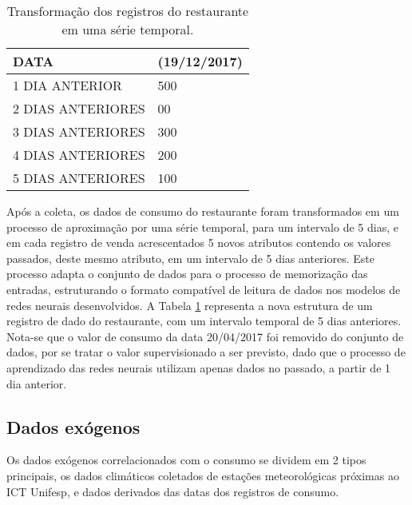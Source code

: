             \begin{table}[!ht]
                \centering
                \begin{tabular}{|l|l|}
                \hline
                    DATA                  & (19/12/2017) \\ \hline
                1 DIA ANTERIOR    & 500        \\
                2 DIAS ANTERIORES & 00                            \\
                3 DIAS ANTERIORES & 300                            \\
                4 DIAS ANTERIORES & 200                            \\
                5 DIAS ANTERIORES & 100                          \\ \hline 
                \end{tabular}
                \caption{Transformação dos registros do restaurante em uma série temporal.}
                \label{table:transformacaodadosrestaurante}
            \end{table}
            
            Após a coleta, os dados de consumo do restaurante foram transformados em um processo de aproximação por uma série temporal, para um intervalo de 5 dias, e em cada registro de venda  acrescentados 5 novos atributos contendo os valores passados, deste mesmo atributo, em um intervalo de 5 dias anteriores. Este processo adapta o conjunto de dados para o processo de memorização das entradas, estruturando o formato compatível de leitura de dados nos modelos de redes neurais desenvolvidos. A Tabela \ref{table:transformacaodadosrestaurante} representa a nova estrutura de um registro de dado do restaurante, com um intervalo temporal de 5 dias anteriores. Nota-se que o valor de consumo da data 20/04/2017 foi removido do conjunto de dados, por se tratar o valor supervisionado a ser previsto, dado que o processo de aprendizado das redes neurais utilizam apenas dados no passado, a partir de 1 dia anterior.
            
           
        \subsection{Dados exógenos} \label{subsec:coleta_exógenos}
            Os dados exógenos correlacionados com o consumo se dividem em 2 tipos principais, os dados climáticos coletados de estações meteorológicas próximas ao ICT Unifesp, e dados derivados das datas dos registros de consumo.
            

